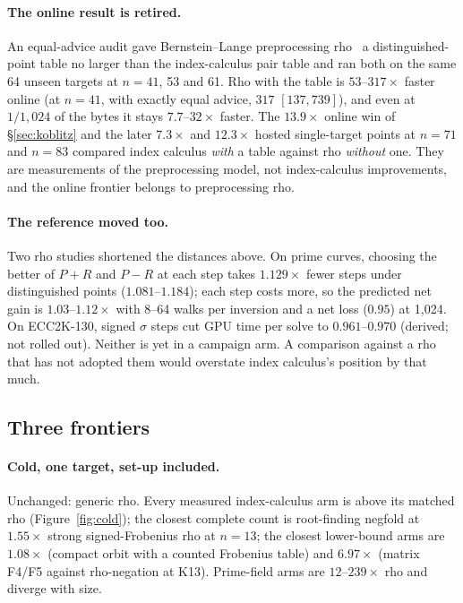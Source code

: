 \paragraph{The online result is retired.} An equal-advice audit
gave Bernstein--Lange preprocessing rho~\cite{bl2012} a distinguished-point
table no larger than the index-calculus pair table and ran both on the same
64 unseen targets at $n=41$, 53 and 61. Rho with the table is $53$--$317\times$
faster online (at $n=41$, with exactly equal advice, $317$ $[137,739]$), and
even at $1/1{,}024$ of the bytes it stays $7.7$--$32\times$ faster. The
$13.9\times$ online win of \S\ref{sec:koblitz} and the later $7.3\times$ and
$12.3\times$ hosted single-target points at $n=71$ and $n=83$ compared
index calculus \emph{with} a table against rho \emph{without} one. They are
measurements of the preprocessing model, not index-calculus improvements,
and the online frontier belongs to preprocessing rho.

\paragraph{The reference moved too.} Two rho studies shortened the
distances above. On prime curves, choosing the better of $P+R$ and $P-R$
at each step takes $1.129\times$ fewer steps under distinguished points
($1.081$--$1.184$); each step costs more, so the predicted net gain is
$1.03$--$1.12\times$ with 8--64 walks per inversion and a net loss ($0.95$)
at 1{,}024. On ECC2K-130, signed $\sigma$ steps cut GPU time per
solve to $0.961$--$0.970$ (derived; not rolled out). Neither is yet in a
campaign arm. A comparison against a rho that has not adopted them would
overstate index calculus's position by that much.

\subsection{Three frontiers}

\paragraph{Cold, one target, set-up included.} Unchanged: generic rho.
Every measured index-calculus arm is above its matched rho
(Figure~\ref{fig:cold}); the closest complete count is root-finding negfold
at $1.55\times$ strong signed-Frobenius rho at $n=13$; the closest
lower-bound arms are $1.08\times$ (compact orbit with a counted Frobenius
table) and $6.97\times$ (matrix F4/F5 against rho-negation at K13).
Prime-field arms are $12$--$239\times$ rho and diverge with size.

